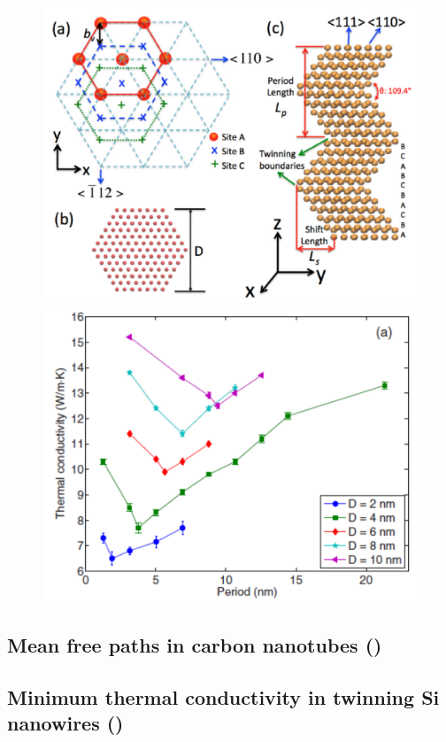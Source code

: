 \begin{figure}[tb]
 \begin{center}
  \includegraphics[width=.49\columnwidth]{pics/twinning_fig1.pdf} 
  \includegraphics[width=.49\columnwidth]{pics/twinning_fig2a.pdf} 
  \caption{}  
\label{fig:twinning_fig1}
 \end{center}
\end{figure}

\subsection{Mean free paths in carbon nanotubes ()}

\subsection{Minimum thermal conductivity in twinning Si nanowires ()}
